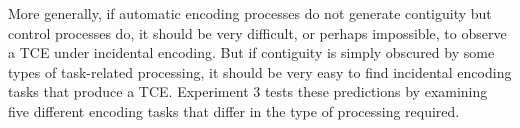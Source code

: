 \documentclass[jou,natbib]{apa6} %
\begin{document}



More generally, if automatic encoding processes do not generate contiguity but control processes do, it should be very difficult, or perhaps impossible, to observe a TCE under incidental encoding. But if contiguity is simply obscured by some types of task-related processing, it should be very easy to find incidental encoding tasks that produce a TCE. Experiment 3 tests these predictions by examining five different encoding tasks that differ in the type of processing required.






\end{document}
